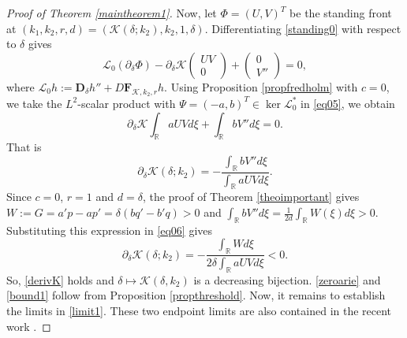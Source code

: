 \documentclass[11pt]{article}
\numberwithin{equation}{section}
\newcommand{\1}{\mathbbm{1}}
\numberwithin{equation}{section}
\theoremstyle{definition}
\def \dis {\displaystyle}
\def \R {\mathbb{R}}
\def \F {\mathbf{F}}
\def \D {\mathbf{D}}
\def \L {\mathcal{L}}
\def \V {\mathcal{V}}
\def \K {\mathcal{K}}
\numberwithin{equation}{section}
\def \dis {\displaystyle}
\begin{document}
\begin{proof}[Proof of Theorem \ref{maintheorem1}]
Now, let $\Phi=(U,V)^T$ be the standing front at $(k_{1},k_2,r,d)=(\K(\delta;k_2),k_2,1,\delta)$. Differentiating \eqref{standing0} with respect to $\delta$ gives
\begin{equation}\label{eq05}
	\L_0(\partial_\delta\Phi)-\partial_\delta\K
	\begin{pmatrix}UV\\0\end{pmatrix}
	+\begin{pmatrix}0\\V''\end{pmatrix}=0,
\end{equation}
where $\L_0 h:=\D_{\delta}h''+D \F_{\K,k_2,r}h$. Using Proposition \ref{propfredholm} with $c=0$, we take the $L^2$-scalar product with $\Psi=(-a,b)^T\in\ker\L^*_0$ in \eqref{eq05}, we obtain
\begin{equation*}
\partial_\delta\K\int_{\R} aUVd\xi+\int_\R bV''d\xi=0.
\end{equation*}
That is 
\begin{equation}\label{eq06}
\partial_\delta\K(\delta;k_2) =-\frac{\dis\int_{\R} bV''d\xi} {\dis\int_{\R} aUVd\xi}.
\end{equation}
Since $c=0$, $r=1$ and $d=\delta$, the proof of Theorem \ref{theoimportant} gives $W:=G=a'p-ap'=\delta(bq'-b'q)>0$ and $\dis \int_{\R} bV''d\xi=\frac{1}{2d} \int_{\R}W(\xi)d\xi>0$.  Substituting this expression in \eqref{eq06} gives
\begin{equation*}
\partial_\delta\K(\delta;k_2) =-\frac{\dis\int_{\R }Wd\xi}{2\delta\dis\int_\R aUVd\xi}<0.
\end{equation*}
So, \eqref{derivK} holds and $\delta \mapsto \K(\delta,k_2)$ is a decreasing bijection. \eqref{zeroarie} and \eqref{bound1} follow from Proposition \ref{propthreshold}. Now, it remains to establish the limits in \eqref{limit1}. 	These two endpoint limits are also contained in the recent work \cite[Theorem 1.3]{ma2026}. 


\end{proof}
\end{document}
